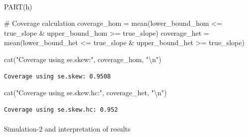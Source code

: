 \documentclass[
  11pt,
]{article}
\makeatletter
\let\oldparagraph\paragraph
\renewcommand{\paragraph}{
    \@ifstar
      \xxxParagraphStar
      \xxxParagraphNoStar
  }
\newcommand{\xxxParagraphStar}[1]{\oldparagraph*{#1}\mbox{}}
\newcommand{\xxxParagraphNoStar}[1]{\oldparagraph{#1}\mbox{}}
\newenvironment{Shaded}{\begin{snugshade}}{\end{snugshade}}
\newcommand{\CommentTok}[1]{\textcolor[rgb]{0.37,0.37,0.37}{#1}}
\newcommand{\FunctionTok}[1]{\textcolor[rgb]{0.28,0.35,0.67}{#1}}
\newcommand{\NormalTok}[1]{\textcolor[rgb]{0.00,0.23,0.31}{#1}}
\newcommand{\OtherTok}[1]{\textcolor[rgb]{0.00,0.23,0.31}{#1}}
\newcommand{\SpecialCharTok}[1]{\textcolor[rgb]{0.37,0.37,0.37}{#1}}
\newcommand{\StringTok}[1]{\textcolor[rgb]{0.13,0.47,0.30}{#1}}
\makeatother
\begin{document}
\paragraph{PART(h)}\label{parth}

\begin{Shaded}
\begin{Highlighting}[]
\CommentTok{\# Coverage calculation}
\NormalTok{coverage\_hom }\OtherTok{=} \FunctionTok{mean}\NormalTok{(lower\_bound\_hom }\SpecialCharTok{\textless{}=}\NormalTok{ true\_slope }\SpecialCharTok{\&} 
\NormalTok{                      upper\_bound\_hom }\SpecialCharTok{\textgreater{}=}\NormalTok{ true\_slope)}
\NormalTok{coverage\_het }\OtherTok{=} \FunctionTok{mean}\NormalTok{(lower\_bound\_het }\SpecialCharTok{\textless{}=}\NormalTok{ true\_slope }\SpecialCharTok{\&} 
\NormalTok{                      upper\_bound\_het }\SpecialCharTok{\textgreater{}=}\NormalTok{ true\_slope)}

\FunctionTok{cat}\NormalTok{(}\StringTok{"Coverage using se.skew:"}\NormalTok{, coverage\_hom, }\StringTok{"}\SpecialCharTok{\textbackslash{}n}\StringTok{"}\NormalTok{)}
\end{Highlighting}
\end{Shaded}

\begin{verbatim}
Coverage using se.skew: 0.9508 
\end{verbatim}

\begin{Shaded}
\begin{Highlighting}[]
\FunctionTok{cat}\NormalTok{(}\StringTok{"Coverage using se.skew.hc:"}\NormalTok{, coverage\_het, }\StringTok{"}\SpecialCharTok{\textbackslash{}n}\StringTok{"}\NormalTok{)}
\end{Highlighting}
\end{Shaded}

\begin{verbatim}
Coverage using se.skew.hc: 0.952 
\end{verbatim}

\paragraph{Simulation-2 and interpretation of
results}\label{simulation-2-and-interpretation-of-results}
\end{document}
